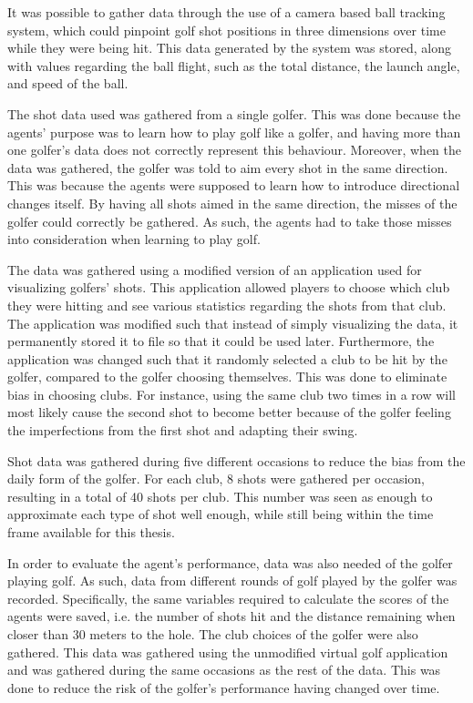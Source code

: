 \documentclass{kththesis}
\begin{document}
It was possible to gather data through the use of a camera based ball tracking system, which could pinpoint golf shot positions in three dimensions over time while they were being hit. This data generated by the system was stored, along with values regarding the ball flight, such as the total distance, the launch angle, and speed of the ball. 

The shot data used was gathered from a single golfer. This was done because the agents' purpose was to learn how to play golf like a golfer, and having more than one golfer's data does not correctly represent this behaviour. Moreover, when the data was gathered, the golfer was told to aim every shot in the same direction. This was because the agents were supposed to learn how to introduce directional changes itself. By having all shots aimed in the same direction, the misses of the golfer could correctly be gathered. As such, the agents had to take those misses into consideration when learning to play golf.

The data was gathered using a modified version of an application used for visualizing golfers' shots. This application allowed players to choose which club they were hitting and see various statistics regarding the shots from that club. The application was modified such that instead of simply visualizing the data, it permanently stored it to file so that it could be used later. Furthermore, the application was changed such that it randomly selected a club to be hit by the golfer, compared to the golfer choosing themselves. This was done to eliminate bias in choosing clubs. For instance, using the same club two times in a row will most likely cause the second shot to become better because of the golfer feeling the imperfections from the first shot and adapting their swing.

Shot data was gathered during five different occasions to reduce the bias from the daily form of the golfer. For each club, 8 shots were gathered per occasion, resulting in a total of 40 shots per club. This number was seen as enough to approximate each type of shot well enough, while still being within the time frame available for this thesis. 

In order to evaluate the agent's performance, data was also needed of the golfer playing golf. As such, data from different rounds of golf played by the golfer was recorded. Specifically, the same variables required to calculate the scores of the agents were saved, i.e. the number of shots hit and the distance remaining when closer than 30 meters to the hole. The club choices of the golfer were also gathered. This data was gathered using the unmodified virtual golf application and was gathered during the same occasions as the rest of the data. This was done to reduce the risk of the golfer's performance having changed over time. 
\end{document}
